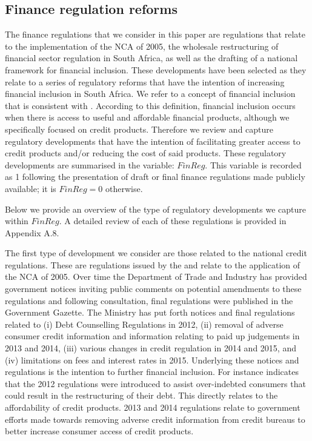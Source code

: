 \documentclass[
  letterpaper,
  DIV=11,
  numbers=noendperiod]{scrartcl}
\begin{document}
\subsection{Finance regulation
reforms}\label{finance-regulation-reforms}

The finance regulations that we consider in this paper are regulations
that relate to the implementation of the NCA of 2005, the wholesale
restructuring of financial sector regulation in South Africa, as well as
the drafting of a national framework for financial inclusion. These
developments have been selected as they relate to a series of regulatory
reforms that have the intention of increasing financial inclusion in
South Africa. We refer to a concept of financial inclusion that is
consistent with \citet{WBGweb}. According to this definition, financial
inclusion occurs when there is access to useful and affordable financial
products, although we specifically focused on credit products. Therefore
we review and capture regulatory developments that have the intention of
facilitating greater access to credit products and/or reducing the cost
of said products. These regulatory developments are summarised in the
variable: \(FinReg\). This variable is recorded as 1 following the
presentation of draft or final finance regulations made publicly
available; it is \(FinReg=0\) otherwise.

Below we provide an overview of the type of regulatory developments we
capture within \(FinReg\). A detailed review of each of these
regulations is provided in Appendix A.8.

The first type of development we consider are those related to the
national credit regulations. These are regulations issued by the
\citet{regulations2006} and relate to the application of the NCA of
2005. Over time the Department of Trade and Industry has provided
government notices inviting public comments on potential amendments to
these regulations and following consultation, final regulations were
published in the Government Gazette. The Ministry has put forth notices
and final regulations related to (i) Debt Counselling Regulations in
2012, (ii) removal of adverse consumer credit information and
information relating to paid up judgements in 2013 and 2014, (iii)
various changes in credit regulation in 2014 and 2015, and (iv)
limitations on fees and interest rates in 2015. Underlying these notices
and regulations is the intention to further financial inclusion. For
instance \citet{roestoff2009} indicates that the 2012 regulations were
introduced to assist over-indebted consumers that could result in the
restructuring of their debt. This directly relates to the affordability
of credit products. 2013 and 2014 regulations relate to government
efforts made towards removing adverse credit information from credit
bureaus to better increase consumer access of credit products.
\end{document}
